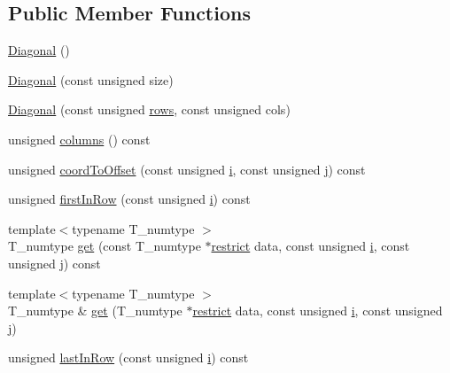 \subsection*{Public Member Functions}
\begin{DoxyCompactItemize}
\item 
\hyperlink{classDiagonal_a8a0fb301083ec1d68055d4ac8a460fc9}{Diagonal} ()
\item 
\hyperlink{classDiagonal_a45f298ba957ce87634f97c7ec94d68ad}{Diagonal} (const unsigned size)
\item 
\hyperlink{classDiagonal_ac05224b31c6dca9f9ed551688d5af701}{Diagonal} (const unsigned \hyperlink{classDiagonal_abe0c77c7f3563dc0d27fc051f046b083}{rows}, const unsigned cols)
\item 
unsigned \hyperlink{classDiagonal_ae18024d3b2f21ea9e9967ae248bbbdfd}{columns} () const 
\item 
unsigned \hyperlink{classDiagonal_a6702c9928dd0e42c8e699ee4be2ca071}{coord\+To\+Offset} (const unsigned \hyperlink{indexexpr_8h_aabd77643995707c185e95c8cb2782c81}{i}, const unsigned \hyperlink{indexexpr_8h_aa1f3325d66516548e69238097857fa98}{j}) const 
\item 
unsigned \hyperlink{classDiagonal_aa48d87386fe718e3fa048ef3c1e253f2}{first\+In\+Row} (const unsigned \hyperlink{indexexpr_8h_aabd77643995707c185e95c8cb2782c81}{i}) const 
\item 
{\footnotesize template$<$typename T\+\_\+numtype $>$ }\\T\+\_\+numtype \hyperlink{classDiagonal_aaf3d7146ede6bac16a10567e125372f8}{get} (const T\+\_\+numtype $\ast$\hyperlink{compiler_8h_a080abdcb9c02438f1cd2bb707af25af8}{restrict} data, const unsigned \hyperlink{indexexpr_8h_aabd77643995707c185e95c8cb2782c81}{i}, const unsigned \hyperlink{indexexpr_8h_aa1f3325d66516548e69238097857fa98}{j}) const 
\item 
{\footnotesize template$<$typename T\+\_\+numtype $>$ }\\T\+\_\+numtype \& \hyperlink{classDiagonal_aca279d4e7377673ed3f0bc3bb30af256}{get} (T\+\_\+numtype $\ast$\hyperlink{compiler_8h_a080abdcb9c02438f1cd2bb707af25af8}{restrict} data, const unsigned \hyperlink{indexexpr_8h_aabd77643995707c185e95c8cb2782c81}{i}, const unsigned \hyperlink{indexexpr_8h_aa1f3325d66516548e69238097857fa98}{j})
\item 
unsigned \hyperlink{classDiagonal_a805cd3fa72e4b19e77cd567b463c5cd5}{last\+In\+Row} (const unsigned \hyperlink{indexexpr_8h_aabd77643995707c185e95c8cb2782c81}{i}) const 
\item 

\end{DoxyCompactItemize}
